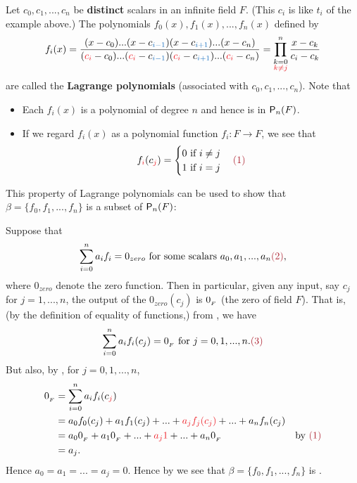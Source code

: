 Let \(c_0, c_1, ..., c_n\) be \textbf{distinct} scalars in an infinite field \(F\).
(This \(c_i\) is like \(t_i\) of the example above.)
The polynomials \(f_0(x), f_1(x), ..., f_n(x)\) defined by
\[
    f_i(x) = \frac{(x - c_0) ... (x - c_{\BLUE{i - 1}})(x - c_{\BLUE{i + 1}}) ... (x - c_n)}{(\RED{c_i} - c_0) ... (\RED{c_i} - c_{\BLUE{i - 1}})(\RED{c_i} - c_{\BLUE{i + 1}}) ... (\RED{c_i} - c_n)}
    = \prod_{\substack{k = 0 \\
                       \RED{k \ne j}}}^n
             \frac{x - c_k}{c_i - c_k}
\]
are called the \textbf{Lagrange polynomials} (associated with \(c_0, c_1, ..., c_n\)).
Note that
\begin{itemize}
\item Each \(f_i(x)\) is a polynomial of degree \(n\) and hence is in \(\textsf{P}_n(F)\).
\item If we regard \(f_i(x)\) as a polynomial function \(f_i : F \to F\), we see that
    \begin{equation*}
        f_{\RED{i}}(c_{\RED{j}}) =
        \begin{cases}
            0 \text{ if } i \ne j \\
            1 \text{ if } i = j \\
        \end{cases}
        \MAROON{(1)}
    \end{equation*}
\end{itemize}


This property of Lagrange polynomials can be used to show that \(\beta = \{ f_0, f_1, ..., f_n \}\) is a \emph{\LID{}} subset of \(\textsf{P}_n(F)\):

Suppose that
\[
    \sum_{i = 0}^n a_i f_i = 0_{zero} \text{ for some scalars } a_0, a_1, ..., a_n \MAROON{(2)},
\]
where \(0_{zero}\) denote the zero function.
Then in particular, given any input, say \(c_j\) for \(j = 1, ..., n\), the output of the \(0_{zero}(c_j)\) is \(0_{_F}\) (the zero of field \(F\)).
That is, (by the definition of equality of functions,) from , we have
\[
    \sum_{i = 0}^n a_i f_i(c_j) = \OF \text{ for } j = 0, 1, ..., n. \MAROON{(3)}
\]
But also, by , for \(j = 0, 1, ..., n\),
\begin{align*}
    \OF & = \sum_{i = 0}^n a_i f_i(c_{\RED{j}}) \\
        & = a_0 f_0(c_j) + a_1 f_1(c_j) + ... + \RED{a_j f_j(c_j)} + ... + a_n f_n(c_j) \\
        & = a_0 \OF + a_1 \OF + ... + \RED{a_j 1} + ... + a_n \OF & \text{by \MAROON{(1)}} \\
        & = a_j.
\end{align*}
Hence \(a_0 = a_1 = ... = a_j = 0\).
Hence by  we see that \(\beta = \{ f_0, f_1, ..., f_n \}\) is \LID{}.

